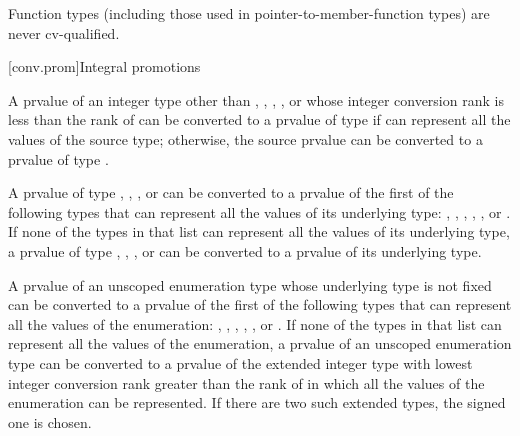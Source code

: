 \pnum
\begin{note}
Function types (including those used in pointer-to-member-function types)
are never cv-qualified.
\end{note}

[conv.prom]{Integral promotions}

\pnum
{}%
A prvalue of an integer type other than , , ,
, or  whose integer conversion
rank is less than the rank of  can be
converted to a prvalue of type  if  can represent
all the values of the source type; otherwise, the source prvalue can be
converted to a prvalue of type .

\pnum
{}%
%
%
A prvalue of type , , , or
 can be converted to a prvalue
of the first of the following types that can represent all the values of
its underlying type: , , ,
, ,
or . If none of the types in that list can
represent all the values of its underlying type, a prvalue of type
, , , or  can be converted
to a prvalue of its underlying type.

\pnum
{}%
A prvalue of an unscoped enumeration type whose underlying type is not
fixed can be converted to a prvalue of the first of the following
types that can represent all the values of the enumeration: ,
, , ,
, or . If none of the types in that
list can represent all the values of the enumeration, a prvalue of an unscoped
enumeration type can be converted to a prvalue of the extended integer type with lowest
integer conversion rank greater than the rank of 
in which all the values of the enumeration can be represented. If there are
two such extended types, the signed one is chosen.

